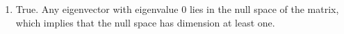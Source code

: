\begin{exercises}
\begin{problist}
\begin{solution}
\begin{enumerate}
				\item True. Any eigenvector with eigenvalue $0$ lies in the
					null space of the matrix, which implies that the null
					space has dimension at least one.
			\end{enumerate}
		\end{solution}
	\end{problist}
\end{exercises}